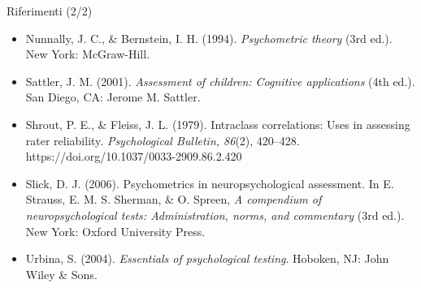 \documentclass[
  ignorenonframetext,
  aspectratio=169,
]{beamer}
\providecommand{\tightlist}{%
  \setlength{\itemsep}{0pt}\setlength{\parskip}{0pt}}
\begin{document}
\begin{frame}{Riferimenti (2/2)}
\label{riferimenti-22}
\scriptsize

\begin{itemize}
\tightlist
\item
  Nunnally, J. C., \& Bernstein, I. H. (1994). \emph{Psychometric
  theory} (3rd ed.). New York: McGraw-Hill.
\item
  Sattler, J. M. (2001). \emph{Assessment of children: Cognitive
  applications} (4th ed.). San Diego, CA: Jerome M. Sattler.
\item
  Shrout, P. E., \& Fleiss, J. L. (1979). Intraclass correlations: Uses
  in assessing rater reliability. \emph{Psychological Bulletin, 86}(2),
  420--428. https://doi.org/10.1037/0033-2909.86.2.420
\item
  Slick, D. J. (2006). Psychometrics in neuropsychological assessment.
  In E. Strauss, E. M. S. Sherman, \& O. Spreen, \emph{A compendium of
  neuropsychological tests: Administration, norms, and commentary} (3rd
  ed.). New York: Oxford University Press.
\item
  Urbina, S. (2004). \emph{Essentials of psychological testing}.
  Hoboken, NJ: John Wiley \& Sons.
\end{itemize}
\end{frame}
\end{document}

